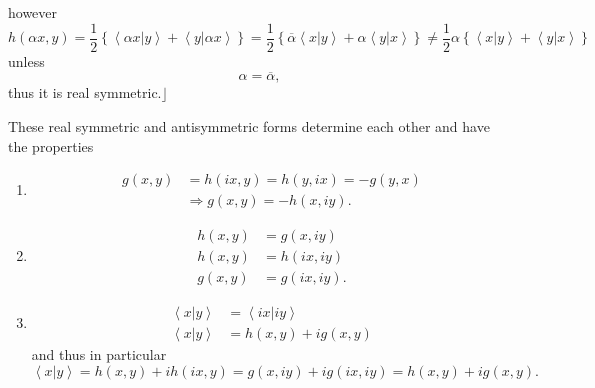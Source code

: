 \documentclass[aps,preprint]{revtex4}
\begin{document}
however 
\begin{equation}
h\left( \alpha x,y\right) =\frac{1}{2}\left\{ \left\langle \left. \alpha
x\right\vert y\right\rangle +\left\langle \left. y\right\vert \alpha
x\right\rangle \right\} =\frac{1}{2}\left\{ \overline{\alpha }\left\langle
\left. x\right\vert y\right\rangle +\alpha \left\langle \left. y\right\vert
x\right\rangle \right\} \neq \frac{1}{2}\alpha \left\{ \left\langle \left.
x\right\vert y\right\rangle +\left\langle \left. y\right\vert x\right\rangle
\right\}
\end{equation}%
unless 
\begin{equation}
\alpha =\overline{\alpha },
\end{equation}%
thus it is real symmetric.$\rfloor $

These real symmetric and antisymmetric forms determine each other and have
the properties

\begin{enumerate}
\item 
\begin{align}
g\left( x,y\right) & =h\left( ix,y\right) =h\left( y,ix\right) =-g\left(
y,x\right) \\
& \Rightarrow g\left( x,y\right) =-h\left( x,iy\right) .
\end{align}

\item 
\begin{align}
h\left( x,y\right) & =g\left( x,iy\right) \\
h\left( x,y\right) & =h\left( ix,iy\right) \\
g\left( x,y\right) & =g\left( ix,iy\right) .
\end{align}

\item 
\begin{align}
\left\langle \left. x\right\vert y\right\rangle & =\left\langle \left.
ix\right\vert iy\right\rangle \\
\left\langle \left. x\right\vert y\right\rangle & =h\left( x,y\right)
+ig\left( x,y\right)
\end{align}%
and thus in particular 
\begin{equation}
\left\langle \left. x\right\vert y\right\rangle =h\left( x,y\right)
+ih\left( ix,y\right) =g\left( x,iy\right) +ig\left( ix,iy\right) =h\left(
x,y\right) +ig\left( x,y\right) .
\end{equation}
\end{enumerate}
\end{document}
